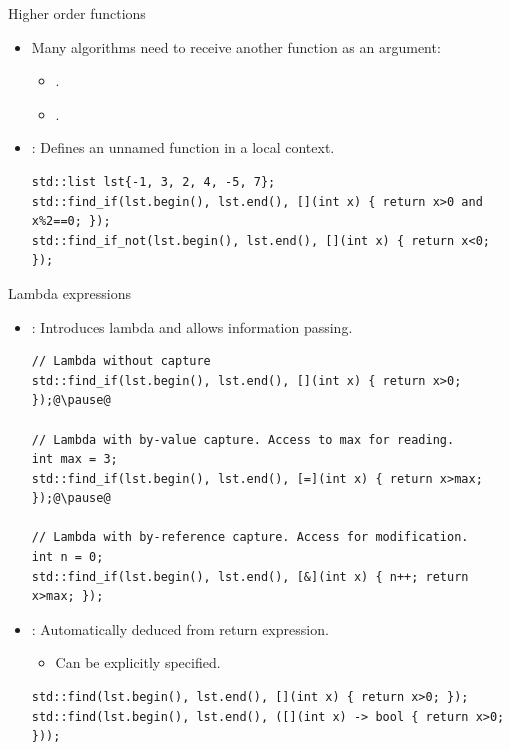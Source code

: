\begin{frame}[t,fragile]{Higher order functions}
\begin{itemize}
  \item Many algorithms need to receive another function as an argument:
    \begin{itemize}
      \item {}.
      \item {}.
    \end{itemize}

  \item {}:
        Defines an unnamed function in a local context.
\begin{lstlisting}[escapechar=@]
std::list lst{-1, 3, 2, 4, -5, 7};
std::find_if(lst.begin(), lst.end(), [](int x) { return x>0 and x%2==0; });
std::find_if_not(lst.begin(), lst.end(), [](int x) { return x<0; });
\end{lstlisting}

\end{itemize}
\end{frame}

\begin{frame}[t,fragile]{Lambda expressions}
\begin{itemize}
  \item {}: 
        Introduces lambda and allows information passing.
\begin{lstlisting}[escapechar=@]
// Lambda without capture
std::find_if(lst.begin(), lst.end(), [](int x) { return x>0; });@\pause@

// Lambda with by-value capture. Access to max for reading.
int max = 3;
std::find_if(lst.begin(), lst.end(), [=](int x) { return x>max; });@\pause@

// Lambda with by-reference capture. Access for modification.
int n = 0;
std::find_if(lst.begin(), lst.end(), [&](int x) { n++; return x>max; });
\end{lstlisting}

  \item {}: 
        Automatically deduced from return expression.
    \begin{itemize}
      \item Can be explicitly specified.
    \end{itemize}
\begin{lstlisting}
std::find(lst.begin(), lst.end(), [](int x) { return x>0; });
std::find(lst.begin(), lst.end(), ([](int x) -> bool { return x>0; }));
\end{lstlisting}
\end{itemize}
\end{frame}

